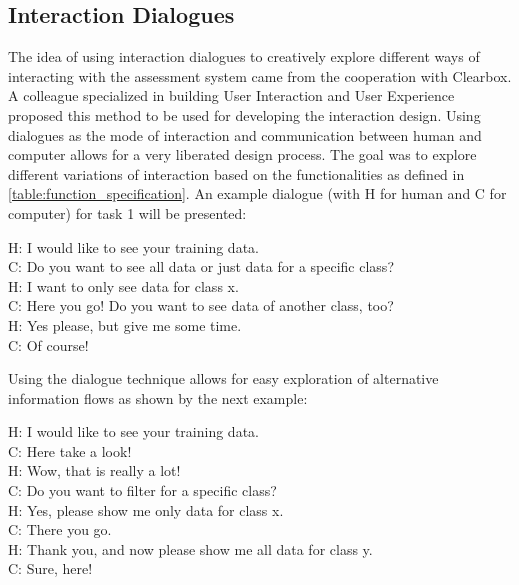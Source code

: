 \documentclass[11pt,a4paper,english]{scrreprt}
\begin{document}
\subsection{Interaction Dialogues}\label{subsection:interaction_dialogues}
The idea of using interaction dialogues to creatively explore different ways of interacting with the assessment system came from the cooperation with Clearbox. A colleague specialized in building User Interaction and User Experience proposed this method to be used for developing the interaction design. Using dialogues as the mode of interaction and communication between human and computer allows for a very liberated design process. The goal was to explore different variations of interaction based on the functionalities as defined in \autoref{table:function_specification}. An example dialogue (with H for human and C for computer) for task 1 will be presented:
\begin{displayquote}
    H: I would like to see your training data.\\
    C: Do you want to see all data or just data for a specific class?\\
    H: I want to only see data for class x.\\
    C: Here you go! Do you want to see data of another class, too?\\
    H: Yes please, but give me some time.\\
    C: Of course!
\end{displayquote}

Using the dialogue technique allows for easy exploration of alternative information flows as shown by the next example:
\begin{displayquote}
    H: I would like to see your training data.\\
    C: Here take a look!\\
    H: Wow, that is really a lot!\\
    C: Do you want to filter for a specific class?\\
    H: Yes, please show me only data for class x.\\
    C: There you go.\\
    H: Thank you, and now please show me all data for class y.\\
    C: Sure, here!
\end{displayquote}
\end{document}
